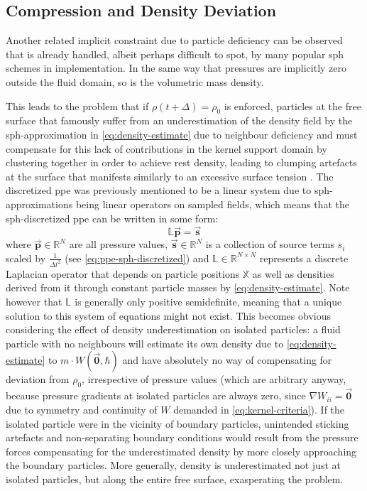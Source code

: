 \documentclass[conference]{IEEEtran}
\newcommand\vek[1]{\vec{\bm{#1}}}
\newcommand\mat[1]{{\mathds{#1}}}
\newcommand\br[1]{\left(#1\right)}
\begin{document}
\subsection{Compression and Density Deviation}
Another related implicit constraint due to particle deficiency can be observed that is already handled, albeit perhaps difficult to spot, by many popular \ac{sph} schemes in implementation. In the same way that pressures are implicitly zero outside the fluid domain, so is the volumetric mass density. 

This leads to the problem that if $\rho\br{t+\Delta}=\rho_0$ is enforced, particles at the free surface that famously \cite{tutorial2019} suffer from an underestimation of the density field by the \ac{sph}-approximation in \autoref{eq:density-estimate} due to neighbour deficiency and must compensate for this lack of contributions in the kernel support domain by clustering together in order to achieve rest density, leading to clumping artefacts at the surface that manifests similarly to an excessive surface tension \cite{iisph}. The discretized \ac{ppe} was previously mentioned to be a linear system due to \ac{sph}-approximations being linear operators on sampled fields, which means that the \ac{sph}-discretized \ac{ppe} can be written in some form:
\begin{equation}
  \mat{L}\vek{p} = \vek{s}
\end{equation}
where $\vek{p}\in\mathds{R}^N$ are all pressure values, $\vek{s}\in\mathds{R}^N$ is a collection of source terms $s_i$ scaled by $\frac{1}{\Delta t^2}$ (see \autoref{eq:ppe-sph-discretized}) and $\mat{L}\in\mathds{R}^{N\times N}$ represents a discrete Laplacian operator that depends on particle positions $\mat{X}$ as well as densities derived from it through constant particle masses by \autoref{eq:density-estimate}. Note however that $\mat{L}$ is generally only positive semidefinite, meaning that a unique solution to this system of equations might not exist. This becomes obvious considering the effect of density underestimation on isolated particles: a fluid particle with no neighbours will estimate its own density due to \autoref{eq:density-estimate} to $m \cdot W(\vek{0}, \hbar)$ and have absolutely no way of compensating for deviation from $\rho_0$, irrespective of pressure values (which are arbitrary anyway, because pressure gradients at isolated particles are always zero, since $\nabla W_{ii}=\vek{0}$ due to symmetry and continuity of $W$ demanded in \autoref{eq:kernel-criteria}). If the isolated particle were in the vicinity of boundary particles, unintended sticking artefacts and non-separating boundary conditions would result from the pressure forces compensating for the underestimated density by more closely approaching the boundary particles. More generally, density is underestimated not just at isolated particles, but along the entire free surface, exasperating the problem. 
\end{document}
